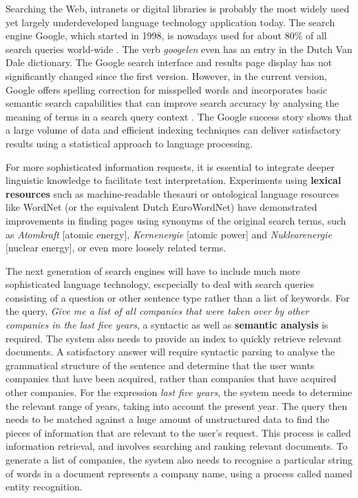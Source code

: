 \documentclass[]{../../metanetpaper}
\begin{document}
\begin{multicols}{2}
Searching the Web, intranets or digital libraries is probably the most widely used yet largely underdeveloped language technology application today. The search engine Google, which started in 1998, is nowadays used for about 80\% of all search queries world-wide \cite{Spiegel}. The verb \emph{googelen} even has an entry in the Dutch Van Dale dictionary. The Google search interface and results page display has not significantly changed since the first version. However, in the current version, Google offers spelling correction for misspelled words and incorporates basic semantic search capabilities that can improve search accuracy by analysing the meaning of terms in a search query context \cite{pc1}. The Google success story shows that a large volume of data and efficient indexing techniques can deliver satisfactory results using a statistical approach to language processing. 

For more sophisticated information requests, it is essential to integrate deeper linguistic knowledge to facilitate text interpretation. Experiments using \textbf{lexical resources} such as machine-readable thesauri or ontological language resources like WordNet (or the equivalent Dutch EuroWordNet) have demonstrated improvements in finding pages using synonyms of the original search terms, such as \textit{Atomkraft} {[}atomic energy{]}, \textit{Kernenergie} {[}atomic power{]} and \textit{Nuklearenergie} {[}nuclear energy{]}, or even more loosely related terms.


The next generation of search engines will have to include much more sophisticated language technology, escpecially to deal with search queries consisting of a question or other sentence type rather than a list of keywords. For the query, \textit{Give me a list of all companies that were taken over by other companies in the last five years}, a syntactic as well as \textbf{semantic analysis} is required. The system also needs to provide an index to quickly retrieve relevant documents. A satisfactory answer will require syntactic parsing to analyse the grammatical structure of the sentence and determine that the user wants companies that have been acquired, rather than companies that have acquired other companies. For the expression \textit{last five years}, the system needs to determine the relevant range of years, taking into account the present year. The query then needs to be matched against a huge amount of unstructured data to find the pieces of information that are relevant to the user’s request. This process is called information retrieval, and involves searching and ranking relevant documents. To generate a list of companies, the system also needs to recognise a particular string of words in a document represents a company name, using a process called named entity recognition.


\end{multicols}
\end{document}
